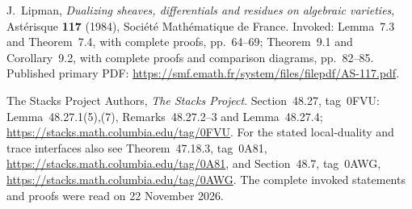 J.~Lipman,
\emph{Dualizing sheaves, differentials and residues on algebraic varieties},
Ast\'erisque \textbf{117} (1984), Soci\'et\'e Math\'ematique de France.
Invoked: Lemma~7.3 and Theorem~7.4, with complete proofs, pp.~64--69;
Theorem~9.1 and Corollary~9.2, with complete proofs and comparison
diagrams, pp.~82--85.
Published primary PDF:
\url{https://smf.emath.fr/system/files/filepdf/AS-117.pdf}.

The Stacks Project Authors, \emph{The Stacks Project}.
Section~48.27, tag~0FVU: Lemma~48.27.1(5),(7),
Remarks~48.27.2--3 and Lemma~48.27.4;
\url{https://stacks.math.columbia.edu/tag/0FVU}.
For the stated local-duality and trace interfaces also see
Theorem~47.18.3, tag~0A81,
\url{https://stacks.math.columbia.edu/tag/0A81}, and
Section~48.7, tag~0AWG,
\url{https://stacks.math.columbia.edu/tag/0AWG}.
The complete invoked statements and proofs were read on 22 November 2026.
